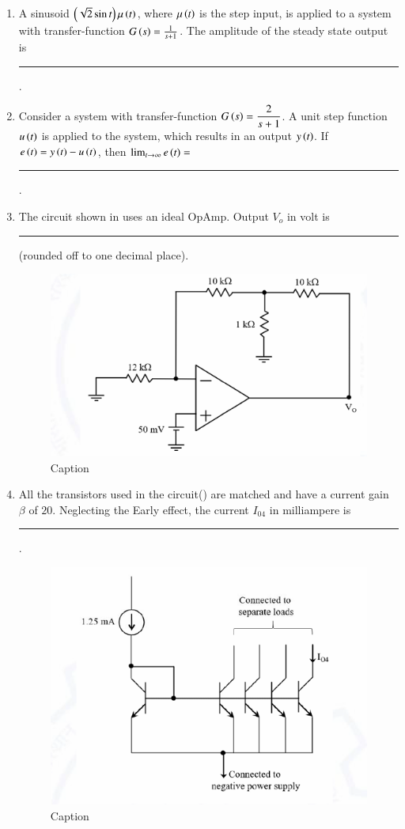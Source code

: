 \documentclass[journal,12pt,onecolumn]{IEEEtran}
\theoremstyle{remark}
\begin{document}
\begin{enumerate}
\item A sinusoid $\left(\sqrt{2}\sin t\right)\mu\left(t\right)$, where $\mu\left(t\right)$ is the step input, is applied to a system with transfer-function $G\left(s\right) = \frac{1}{s+1}$. The amplitude of the steady state output is \rule{1.5cm}{0.4pt}. \par \hfill{}

\item Consider a system with transfer-function $G\left(s\right) = \dfrac{2}{s+1}$. A unit step function
$u\left(t\right)$ is applied to the system, which results in an output $y\left(t\right)$.
If $e\left(t\right) = y\left(t\right) - u\left(t\right)$, then $\lim_{t \to \infty} e\left(t\right) =$ \rule{1.5cm}{0.4pt}. \par \hfill{}

\item The circuit shown in  uses an ideal OpAmp. Output $V_o$ in volt is \rule{1.5cm}{0.4pt} (rounded off to one decimal place). \par \hfill{}
\begin{figure}[H]
    \centering
    \includegraphics[width=0.5\linewidth]{Figs/Q-47.png}
    \caption{Caption}
    \label{47}
\end{figure}

\item All the transistors used in the circuit() are matched and have a current gain $\beta$ of $20$. Neglecting the Early effect, the current $I_{04}$ in milliampere is \rule{1.5cm}{0.4pt}. \par \hfill{}
\begin{figure}[H]
    \centering
    \includegraphics[width=0.5\linewidth]{Figs/Q-48.png}
    \caption{Caption}
    \label{48}
\end{figure}


\end{enumerate}
\end{document}
